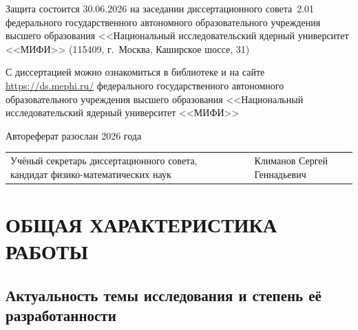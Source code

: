 \documentclass[12pt,a5paper]{article}
\begin{document}
{\vspace{0.15cm}

\noindent Защита состоится 30.06.2026 на заседании диссертационного совета~2.01 федерального государственного автономного образовательного учреждения высшего образования <<Национальный исследовательский ядерный университет <<МИФИ>> (115409, г.~Москва, Каширское шоссе, 31)

\vspace{0.1cm}

\noindent С диссертацией можно ознакомиться в библиотеке и на сайте \url{https://ds.mephi.ru/} федерального государственного автономного образовательного учреждения высшего образования <<Национальный исследовательский ядерный университет <<МИФИ>>

\vspace{0.1cm}

\noindent Автореферат разослан \underline{\hspace{2.5cm}} 2026 года

\vspace{0.2cm}

\noindent\begin{tabular}{@{}p{4.2cm}p{2cm}p{3.5cm}@{}}
Учёный секретарь диссертационного совета, кандидат физико-математических наук & & Климанов Сергей Геннадьевич \\
\end{tabular}
}

\newpage
\setcounter{page}{3}

\section*{ОБЩАЯ ХАРАКТЕРИСТИКА РАБОТЫ}

\subsection*{Актуальность темы исследования и степень её разработанности}
\end{document}
